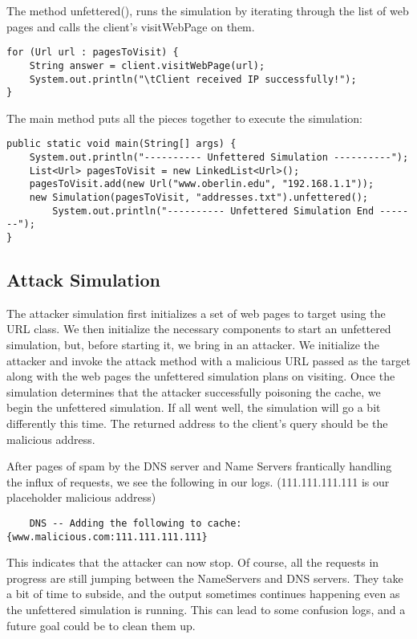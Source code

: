 \documentclass[a4paper, 12pt]{article} %
\begin{document}
The method unfettered(), runs the simulation by iterating through the list of web pages and calls the client’s visitWebPage on them. 

\begin{lstlisting}
for (Url url : pagesToVisit) {
	String answer = client.visitWebPage(url);
	System.out.println("\tClient received IP successfully!");
}
\end{lstlisting}

The main method puts all the pieces together to execute the simulation:

\begin{lstlisting}
public static void main(String[] args) {
	System.out.println("---------- Unfettered Simulation ----------");
	List<Url> pagesToVisit = new LinkedList<Url>();
	pagesToVisit.add(new Url("www.oberlin.edu", "192.168.1.1"));
	new Simulation(pagesToVisit, "addresses.txt").unfettered();
		System.out.println("---------- Unfettered Simulation End -------");
}
\end{lstlisting}




\subsection*{Attack Simulation}

The attacker simulation first initializes a set of web pages to target using the URL class. We then initialize the necessary components to start an unfettered simulation, but, before starting it, we bring in an attacker. We initialize the attacker and invoke the attack method with a malicious URL passed as the target along with the web pages the unfettered simulation plans on visiting. Once the simulation determines that the attacker successfully poisoning the cache, we begin the unfettered simulation. If all went well, the simulation will go a bit differently this time. The returned address to the client's query should be the malicious address.

After pages of spam by the DNS server and Name Servers frantically handling the influx of requests, we see the following in our logs. (111.111.111.111 is our placeholder malicious address)

\begin{verbatim}
    DNS -- Adding the following to cache: {www.malicious.com:111.111.111.111}
\end{verbatim}

This indicates that the attacker can now stop. Of course, all the requests in progress are still jumping between the NameServers and DNS servers. They take a bit of time to subside, and the output sometimes continues happening even as the unfettered simulation is running. This can lead to some confusion logs, and a future goal could be to clean them up.
\end{document}
